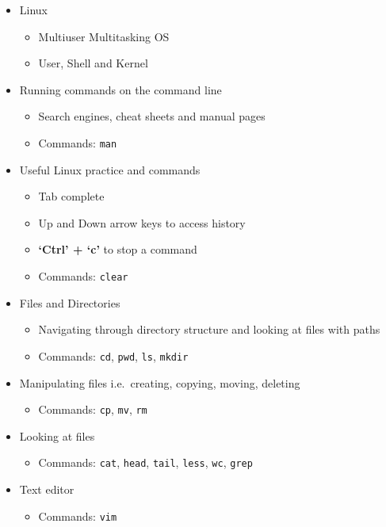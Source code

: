 \documentclass[
  letterpaper,
  DIV=11,
  numbers=noendperiod]{scrreprt}
\providecommand{\tightlist}{%
  \setlength{\itemsep}{0pt}\setlength{\parskip}{0pt}}\usepackage{longtable,booktabs,array}
\begin{document}
\begin{itemize}
\tightlist
\item
  Linux

  \begin{itemize}
  \tightlist
  \item
    Multiuser Multitasking OS
  \item
    User, Shell and Kernel
  \end{itemize}
\item
  Running commands on the command line

  \begin{itemize}
  \tightlist
  \item
    Search engines, cheat sheets and manual pages
  \item
    Commands: \texttt{man}
  \end{itemize}
\item
  Useful Linux practice and commands

  \begin{itemize}
  \tightlist
  \item
    Tab complete
  \item
    Up and Down arrow keys to access history
  \item
    \textbf{`Ctrl' + `c'} to stop a command
  \item
    Commands: \texttt{clear}
  \end{itemize}
\item
  Files and Directories

  \begin{itemize}
  \tightlist
  \item
    Navigating through directory structure and looking at files with
    paths
  \item
    Commands: \texttt{cd}, \texttt{pwd}, \texttt{ls}, \texttt{mkdir}
  \end{itemize}
\item
  Manipulating files i.e.~creating, copying, moving, deleting

  \begin{itemize}
  \tightlist
  \item
    Commands: \texttt{cp}, \texttt{mv}, \texttt{rm}
  \end{itemize}
\item
  Looking at files

  \begin{itemize}
  \tightlist
  \item
    Commands: \texttt{cat}, \texttt{head}, \texttt{tail}, \texttt{less},
    \texttt{wc}, \texttt{grep}
  \end{itemize}
\item
  Text editor

  \begin{itemize}
  \tightlist
  \item
    Commands: \texttt{vim}
  \end{itemize}
\end{itemize}
\end{document}
